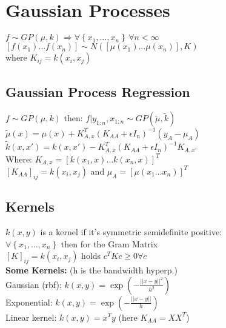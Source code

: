 \section{Gaussian Processes}
$f\sim GP(\mu,k)\Rightarrow\forall \left\{x_1, \dots, x_n\right\} \,\forall n < \infty$\\
$\left[f(x_1)\dots f(x_n)\right]\sim N(\left[\mu(x_1)\dots \mu(x_n)\right], K)$\\ where $K_{ij}=k(x_i,x_j)$
\subsection{Gaussian Process Regression}
$f\sim GP(\mu,k)$ then: $f\vert y_{1:n},x_{1:n} \sim GP(\tilde{\mu},\tilde{k})$\\
$\tilde{\mu}(x) = \mu(x) + K_{A, x}^T{(K_{AA}+\epsilon I_n)}^{-1}\left(y_A-\mu_A\right)$\\
$\tilde{k}(x,x') = k(x,x') - K_{A,x}^T{(K_{AA}+\epsilon I_n)}^{-1} K_{A,x'}$\\
Where: $K_{A,x} = {\left[k(x_1,x)\dots k(x_n,x)\right]}^T$\\
${\left[K_{AA}\right]}_{ij} = k(x_i, x_j)$ and $\mu_A = {\left[\mu(x_1 \dots x_n)\right]}^T$


\subsection{Kernels}
	$k(x,y)$ is a kernel if it's symmetric semidefinite positive:\\
	$\forall \left\{x_1, \dots, x_n \right\}$ then for the Gram Matrix \\
	${\left[K\right]}_{ij}=k(x_i,x_j)$ holds $c^TKc\geq0\forall c$\\
    \textbf{Some Kernels:} (h is the bandwidth hyperp.)\\
    Gaussian (rbf): $k(x,y) = \exp( -\tfrac{||x-y||^2}{h^2})$\\
    Exponential: $k(x,y) = \exp( -\tfrac{||x-y||}{h})$\\
    Linear kernel: $k(x,y) = x^Ty$ (here $K_{AA} = XX^T$)
